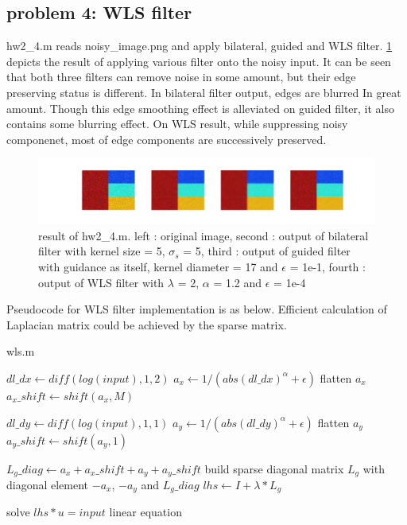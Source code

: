 \documentclass[extendedabs]{bmvc2k}
\begin{document}
\subsection*{problem 4: WLS filter}

hw2\_4.m reads noisy\_image.png and apply bilateral, guided and WLS filter. 
\figurename{\ref{fig:11}} depicts the result of applying various filter onto the noisy input. 
It can be seen that both three filters can remove noise in some amount, but their 
edge preserving status is different. In bilateral filter output, edges are blurred In
great amount. Though this edge smoothing effect is alleviated on guided filter, it also
contains some blurring effect. On WLS result, while suppressing noisy componenet, most of 
edge components are successively preserved.

\begin{figure}[h]
    \centering
    \includegraphics[width=\linewidth]{hw2_4_1}
    \caption{result of hw2\_4.m. left : original image, second : output of bilateral filter 
    with kernel size = 5, $\sigma_s$ = 5, third : output of guided filter with guidance as
    itself, kernel diameter = 17 and $\epsilon$ = 1e-1, fourth : output of WLS filter with
    $\lambda$ = 2, $\alpha$ = 1.2 and $\epsilon$ = 1e-4}
    \label{fig:11}
\end{figure}

Pseudocode for WLS filter implementation is as below. Efficient calculation of 
Laplacian matrix could be achieved by the sparse matrix.

\begin{algorithm}
    \caption{wls.m}
    $dl\_dx \gets diff(log(input), 1, 2)$\;
    $a_x \gets 1 / (abs(dl\_dx)^\alpha + \epsilon)$\;
    flatten $a_x$\;
    $a_x\_shift \gets shift(a_x, M)$\;

    $dl\_dy \gets diff(log(input), 1, 1)$\;
    $a_y \gets 1 / (abs(dl\_dy)^\alpha + \epsilon)$\;
    flatten $a_y$\;
    $a_y\_shift \gets shift(a_y, 1)$\;

    $L_g\_diag \gets a_x + a_x\_shift + a_y + a_y\_shift$\;
    build sparse diagonal matrix $L_g$ with diagonal element $-a_x$, $-a_y$ and $L_g\_diag$\;
    $lhs \gets I + \lambda * L_g$\;

    solve $lhs * u = input$ linear equation\;
\end{algorithm}
\end{document}
